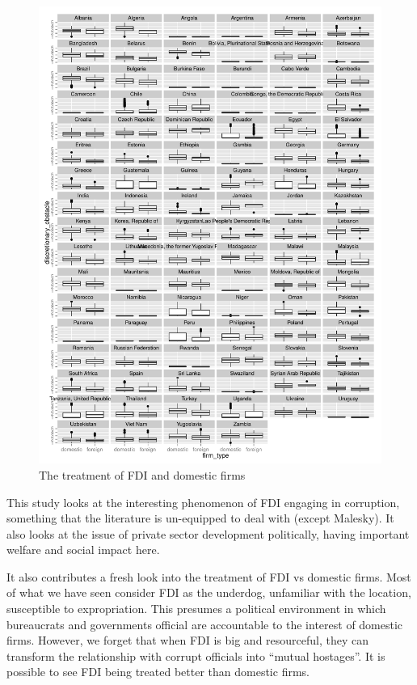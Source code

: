 \documentclass[12pt]{article}
\begin{document}
\begin{figure}[!ht]
\includegraphics[width=\textwidth, height=\textheight,keepaspectratio]{../figure/fdi_domestic_treatment}
\caption{The treatment of FDI and domestic firms}
\label{fig:fdi_domestic_treatment}
\end{figure}

This study looks at the interesting phenomenon of FDI engaging in corruption, something that the literature is un-equipped to deal with (except Malesky). It also looks at the issue of private sector development politically, having important welfare and social impact here.

It also contributes a fresh look into the treatment of FDI vs domestic firms. Most of what we have seen consider FDI as the underdog, unfamiliar with the location, susceptible to expropriation. This presumes a political environment in which bureaucrats and governments official are accountable to the interest of domestic firms. However, we forget that when FDI is big and resourceful, they can transform the relationship with corrupt officials into ``mutual hostages''. It is possible to see FDI being treated better than domestic firms.
\end{document}
